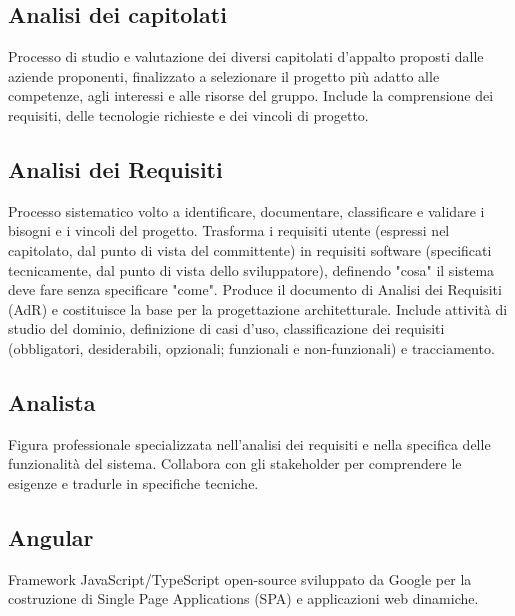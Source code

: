 \documentclass[a4paper,11pt]{article}
\begin{document}
\subsection{Analisi dei capitolati}
Processo di studio e valutazione dei diversi capitolati d'appalto proposti dalle aziende proponenti, finalizzato a selezionare il progetto più adatto alle competenze, agli interessi e alle risorse del gruppo. Include la comprensione dei requisiti, delle tecnologie richieste e dei vincoli di progetto.









\subsection{Analisi dei Requisiti}
Processo sistematico volto a identificare, documentare, classificare e validare i bisogni e i vincoli del progetto. Trasforma i requisiti utente (espressi nel capitolato, dal punto di vista del committente) in requisiti software (specificati tecnicamente, dal punto di vista dello sviluppatore), definendo "cosa" il sistema deve fare senza specificare "come". Produce il documento di Analisi dei Requisiti (AdR) e costituisce la base per la progettazione architetturale. Include attività di studio del dominio, definizione di casi d'uso, classificazione dei requisiti (obbligatori, desiderabili, opzionali; funzionali e non-funzionali) e tracciamento.









\subsection{Analista}
Figura professionale specializzata nell'analisi dei requisiti e nella specifica delle funzionalità del sistema. Collabora con gli stakeholder per comprendere le esigenze e tradurle in specifiche tecniche.









\subsection{Angular}
Framework JavaScript/TypeScript open-source sviluppato da Google per la costruzione di Single Page Applications (SPA) e applicazioni web dinamiche.
\end{document}
